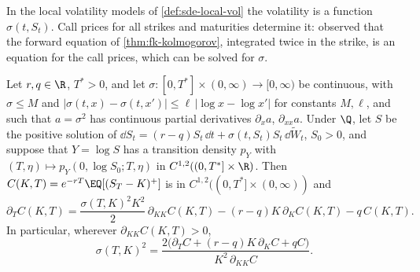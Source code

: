 In the local volatility models of \cref{def:sde-local-vol} the volatility is a function $\sigma(t,S_t)$.
Call prices for all strikes and maturities determine it: \textcite{dupire-smile} observed that the
forward equation of \cref{thm:fk-kolmogorov}, integrated twice in the strike, is an equation for the
call prices, which can be solved for $\sigma$.

\begin{theorem}\label{thm:iv-dupire}
Let $r,q\in\R$, $T^*>0$, and let $\sigma:[0,T^*]\times(0,\infty)\to[0,\infty)$ be continuous, with
$\sigma\le M$ and $|\sigma(t,x)-\sigma(t,x')|\le\ell\,|\log x-\log x'|$ for constants $M,\ell$, and such that
$a=\sigma^2$ has continuous partial derivatives $\partial_xa$, $\partial_{xx}a$. Under $\Q$, let $S$ be the
positive solution of $\dd S_t=(r-q)S_t\,\dd t+\sigma(t,S_t)S_t\,\dd\widetilde W_t$, $S_0>0$, and suppose that
$Y=\log S$ has a transition density $p_Y$ with $(T,\eta)\mapsto p_Y(0,\log S_0;T,\eta)$ in
$C^{1,2}((0,T^*]\times\R)$. Then $C(K,T)=e^{-rT}\EQ[(S_T-K)^+]$ is in $C^{1,2}((0,T^*]\times(0,\infty))$ and
\begin{equation}\label{eq:iv-dupire-pde}
  \partial_TC(K,T)=\frac{\sigma(T,K)^2K^2}{2}\,\partial_{KK}C(K,T)-(r-q)K\,\partial_KC(K,T)-q\,C(K,T).
\end{equation}
In particular, wherever $\partial_{KK}C(K,T)>0$,
\begin{equation}\label{eq:iv-dupire}
  \sigma(T,K)^2=\frac{2\big(\partial_TC+(r-q)K\,\partial_KC+qC\big)}{K^2\,\partial_{KK}C}.
\end{equation}
\end{theorem}

